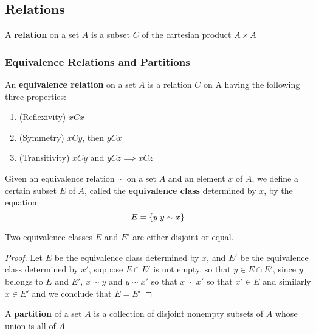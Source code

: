 \subsection{Relations}
\begin{define}
	A \textbf{relation} on a set $ A $ is a subset $ C $ of the cartesian product $ A \times A $
\end{define}

\subsubsection*{Equivalence Relations and Partitions}

An \textbf{equivalence relation} on a set $ A $ is a relation $ C $ on A having the following three properties:
\begin{enumerate}
	\item (Reflexivity) $ xCx $
	\item (Symmetry) $ xCy $, then $ yCx $
	\item (Transitivity) $ xCy  $ and $ yCz \implies xCz $
\end{enumerate}

Given an equivalence relation $ \sim $ on a set $ A $ and an element $ x  $ of $ A $, we define a certain subset $ E $ of $ A $, called the \textbf{equivalence class} determined by $ x $, by the equation:
\[ E = \left\lbrace y | y \sim x \right\rbrace \]

\begin{lem}
	Two equivalence classes $ E $ and $ E' $ are either disjoint or equal.
\end{lem}

\begin{proof}
	Let $ E $ be the equivalence class determined by $ x $, and $ E' $ be the equivalence class determined by $ x' $, suppose $ E \cap E'  $ is not empty, so that $ y \in E \cap E' $, since $ y $ belongs to $ E $ and $ E' $, $ x \sim y $ and $ y \sim x' $ so that $ x \sim x' $ so that $ x' \in E $ and similarly $  x \in E' $ and we conclude that $ E = E' $
\end{proof}

\begin{defn}
	A \textbf{partition} of a set $ A $ is a collection of disjoint nonempty subsets of $ A $ whose union is all of $ A $
\end{defn}

